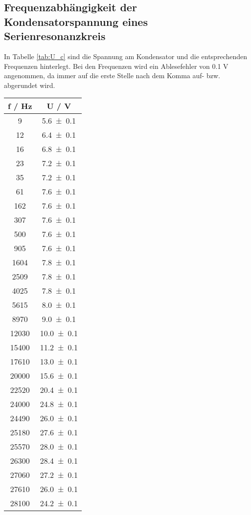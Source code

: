 \subsection{Frequenzabhängigkeit der Kondensatorspannung eines  Serienresonanzkreis}
In Tabelle \ref{tab:U_c} sind die Spannung am Kondensator und die entsprechenden Frequenzen hinterlegt. Bei den Frequenzen wird ein Ablesefehler von 0.1 V angenommen, da immer auf die erste Stelle nach dem Komma auf- bzw. abgerundet wird.
\begin{table}
  \centering
  \begin{tabular}{c c}
	\toprule
	f / Hz & U / V \\
	\midrule
	9	& \num{5.6 +- 0.1}	\\
	12	& \num{6.4 +- 0.1}	\\
	16	& \num{6.8 +- 0.1}	\\
	23	& \num{7.2 +- 0.1}	\\
	35	& \num{7.2 +- 0.1}	\\
	61	& \num{7.6 +- 0.1}	\\
	162	& \num{7.6 +- 0.1}	\\
	307	& \num{7.6 +- 0.1}	\\
	500	& \num{7.6 +- 0.1}	\\
	905	& \num{7.6 +- 0.1}	\\
	1604	& \num{7.8 +- 0.1}	\\
	2509	& \num{7.8 +- 0.1}	\\
	4025	& \num{7.8 +- 0.1}	\\
	5615	& \num{8.0 +- 0.1}	\\
	8970	& \num{9.0 +- 0.1}	\\
	12030	& \num{10.0 +- 0.1}	\\
	15400	& \num{11.2 +- 0.1}	\\
	17610	& \num{13.0 +- 0.1}	\\
	20000	& \num{15.6 +- 0.1}	\\
	22520	& \num{20.4 +- 0.1}	\\
	24000	& \num{24.8 +- 0.1}	\\
	24490	& \num{26.0 +- 0.1}	\\
	25180	& \num{27.6 +- 0.1}	\\
	25570	& \num{28.0 +- 0.1}	\\
	26300	& \num{28.4 +- 0.1}	\\
	27060	& \num{27.2 +- 0.1}	\\
	27610	& \num{26.0 +- 0.1}	\\
	28100	& \num{24.2 +- 0.1}	\\

\end{tabular}
\end{table}
